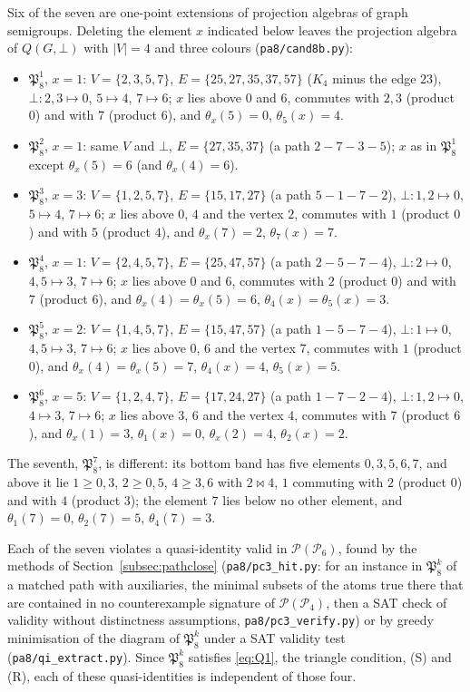 \documentclass[11pt]{amsart}
\theoremstyle{definition}
\renewcommand{\P}{\mathcal{P}}
\begin{document}
Six of the seven are one-point extensions of projection algebras of graph semigroups. Deleting the element $x$ indicated below leaves the projection algebra of $Q(G,\bot)$ with $|V|=4$ and three colours (\texttt{pa8/cand8b.py}):
\begin{itemize}[nosep]
\item $\mathfrak P_8^1$, $x=1$: $V=\{2,3,5,7\}$, $E=\{25,27,35,37,57\}$ ($K_4$ minus the edge $23$), $\bot\colon2,3\mapsto0$, $5\mapsto4$, $7\mapsto6$; $x$ lies above $0$ and $6$, commutes with $2,3$ (product $0$) and with $7$ (product $6$), and $\theta_x(5)=0$, $\theta_5(x)=4$.
\item $\mathfrak P_8^2$, $x=1$: same $V$ and $\bot$, $E=\{27,35,37\}$ (a path $2-7-3-5$); $x$ as in $\mathfrak P_8^1$ except $\theta_x(5)=6$ (and $\theta_x(4)=6$).
\item $\mathfrak P_8^3$, $x=3$: $V=\{1,2,5,7\}$, $E=\{15,17,27\}$ (a path $5-1-7-2$), $\bot\colon1,2\mapsto0$, $5\mapsto4$, $7\mapsto6$; $x$ lies above $0$, $4$ and the vertex $2$, commutes with $1$ (product $0$) and with $5$ (product $4$), and $\theta_x(7)=2$, $\theta_7(x)=7$.
\item $\mathfrak P_8^4$, $x=1$: $V=\{2,4,5,7\}$, $E=\{25,47,57\}$ (a path $2-5-7-4$), $\bot\colon2\mapsto0$, $4,5\mapsto3$, $7\mapsto6$; $x$ lies above $0$ and $6$, commutes with $2$ (product $0$) and with $7$ (product $6$), and $\theta_x(4)=\theta_x(5)=6$, $\theta_4(x)=\theta_5(x)=3$.
\item $\mathfrak P_8^5$, $x=2$: $V=\{1,4,5,7\}$, $E=\{15,47,57\}$ (a path $1-5-7-4$), $\bot\colon1\mapsto0$, $4,5\mapsto3$, $7\mapsto6$; $x$ lies above $0$, $6$ and the vertex $7$, commutes with $1$ (product $0$), and $\theta_x(4)=\theta_x(5)=7$, $\theta_4(x)=4$, $\theta_5(x)=5$.
\item $\mathfrak P_8^6$, $x=5$: $V=\{1,2,4,7\}$, $E=\{17,24,27\}$ (a path $1-7-2-4$), $\bot\colon1,2\mapsto0$, $4\mapsto3$, $7\mapsto6$; $x$ lies above $3$, $6$ and the vertex $4$, commutes with $7$ (product $6$), and $\theta_x(1)=3$, $\theta_1(x)=0$, $\theta_x(2)=4$, $\theta_2(x)=2$.
\end{itemize}
The seventh, $\mathfrak P_8^7$, is different: its bottom band has five elements $0,3,5,6,7$, and above it lie $1\ge0,3$, $2\ge0,5$, $4\ge3,6$ with $2\bowtie4$, $1$ commuting with $2$ (product $0$) and with $4$ (product $3$); the element $7$ lies below no other element, and $\theta_1(7)=0$, $\theta_2(7)=5$, $\theta_4(7)=3$.

Each of the seven violates a quasi-identity valid in $\P(\P_6)$, found by the methods of Section~\ref{subsec:pathclose} (\texttt{pa8/pc3\_hit.py}: for an instance in $\mathfrak P_8^k$ of a matched path with auxiliaries, the minimal subsets of the atoms true there that are contained in no counterexample signature of $\P(\P_4)$, then a SAT check of validity without distinctness assumptions, \texttt{pa8/pc3\_verify.py}) or by greedy minimisation of the diagram of $\mathfrak P_8^k$ under a SAT validity test (\texttt{pa8/qi\_extract.py}). Since $\mathfrak P_8^k$ satisfies \eqref{eq:Q1}, the triangle condition, (S) and (R), each of these quasi-identities is independent of those four.
\end{document}
